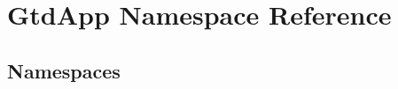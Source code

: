\hypertarget{namespace_gtd_app}{}\section{Gtd\+App Namespace Reference}
\label{namespace_gtd_app}
\subsection*{Namespaces}
\begin{DoxyCompactItemize}
\end{DoxyCompactItemize}
